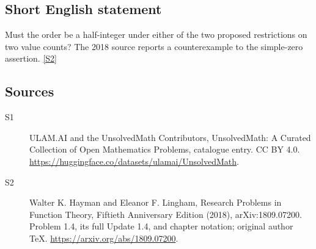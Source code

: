 \documentclass[11pt]{article}
\newcommand{\sref}[2]{\hyperlink{source:#1:#2}{[S#2]}}
\begin{document}
\subsection{Short English statement}
Must the order be a half-integer under either of the two proposed restrictions on two value counts? The 2018 source reports a counterexample to the simple-zero assertion. \sref{statement}{2}
\subsection{Sources}
\begin{description}
\item[\hypertarget{source:statement:1}{S1}] ULAM.AI and the UnsolvedMath Contributors, UnsolvedMath: A Curated Collection of Open Mathematics Problems, catalogue entry. CC BY 4.0. \url{https://huggingface.co/datasets/ulamai/UnsolvedMath}.
\item[\hypertarget{source:statement:2}{S2}] Walter K. Hayman and Eleanor F. Lingham, Research Problems in Function Theory, Fiftieth Anniversary Edition (2018), arXiv:1809.07200. Problem 1.4, its full Update 1.4, and chapter notation; original author TeX. \url{https://arxiv.org/abs/1809.07200}.
\end{description}
\label{end:statement}
\end{document}
